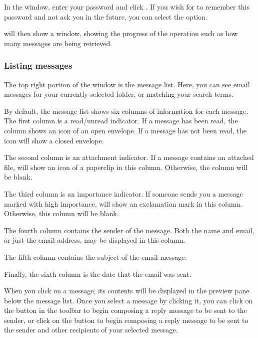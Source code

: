 
In the  window, enter your password and click
. If you wish for  to remember this password
and not ask you in the future, you can select the  option.

 will then show a  window, showing the 
progress of the operation such as how many messages are being retrieved.

\subsubsection{Listing messages}

The top right portion of the  window is the message list. Here, you 
can see email messages for your currently selected folder, or matching your 
search terms.

By default, the message list shows six columns of information for each message.
The first column is a read/unread indicator. If a message has been read, the 
column shows an icon of an open envelope. If a message has not been read,
the icon will show a closed envelope.

The second column is an attachment indicator. If a message contains an attached
file,  will show an icon of a paperclip in this column. Otherwise, 
the column will be blank.

The third column is an importance indicator. If someone sends you a message
marked with high importance,  will show an exclamation mark in this
column. Otherwise, this column will be blank.

The fourth column contains the sender of the message. Both the name and email, 
or just the email address, may be displayed in this column. 

The fifth column contains the subject of the email message. 

Finally, the sixth column is the date that the email was sent.

When you click on a message, its contents will be displayed in the preview
pane below the message list. Once you select a message by clicking it, you
can click on the  button in the toolbar to begin composing a reply
message to be sent to the sender, or click on the  button 
to  begin composing a reply message to be sent to the sender and other 
recipients of your selected message.


